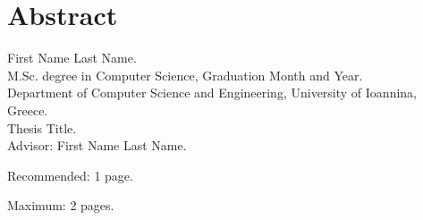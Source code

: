 \chapter*{Abstract}

First Name Last Name.\\
M.Sc. degree in Computer Science, Graduation Month and Year.\\
Department of Computer Science and Engineering, University of Ioannina, Greece.\\
Thesis Title.\\
Advisor: First Name Last Name.\\
\bigskip

\y\noindent Recommended: 1 page.

\y\noindent Maximum: 2 pages.